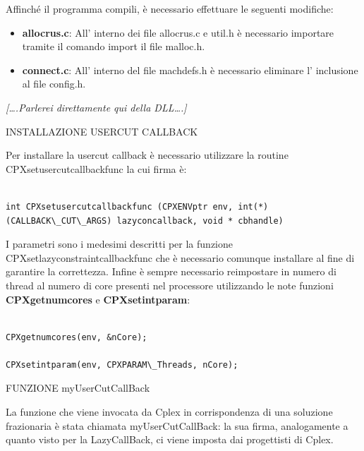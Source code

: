 \documentclass[11pt]{article}
\begin{document}
Affinché il programma compili, è necessario effettuare le seguenti modifiche:

\begin{itemize}
	\item \textbf{allocrus.c}: All' interno dei file allocrus.c e util.h è necessario importare tramite il comando import il file malloc.h.
	\item \textbf{connect.c}: All' interno del file machdefs.h è necessario eliminare l' inclusione al file config.h.
\end{itemize}

\textit{[….Parlerei direttamente qui della DLL….]}


\vspace{2\baselineskip}
INSTALLAZIONE USERCUT CALLBACK
\vspace{2\baselineskip}


Per installare la usercut callback è necessario utilizzare la routine CPXsetusercutcallbackfunc la cui firma è:


\begin{lstlisting}

int CPXsetusercutcallbackfunc (CPXENVptr env, int(*)(CALLBACK\_CUT\_ARGS) lazyconcallback, void * cbhandle)

\end{lstlisting}



I parametri sono i medesimi descritti per la funzione CPXsetlazyconstraintcallbackfunc che è necessario comunque installare al fine di garantire la correttezza. Infine è sempre necessario reimpostare in numero di thread al numero di core presenti nel processore utilizzando le note funzioni \textbf{CPXgetnumcores} e \textbf{CPXsetintparam}:


\begin{lstlisting}

CPXgetnumcores(env, &nCore);
	
CPXsetintparam(env, CPXPARAM\_Threads, nCore);

\end{lstlisting}



\vspace{2\baselineskip}
FUNZIONE myUserCutCallBack
\vspace{2\baselineskip}

La funzione che viene invocata da Cplex in corrispondenza di una soluzione frazionaria è stata chiamata myUserCutCallBack: la sua firma, analogamente a quanto visto per la LazyCallBack, ci viene imposta dai progettisti di Cplex.
\end{document}
